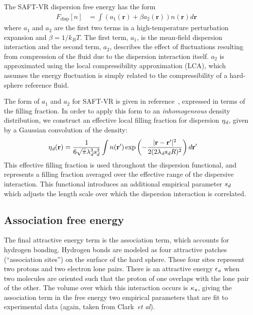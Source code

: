 \documentclass[letterpaper,twocolumn,amsmath,amssymb,prb]{revtex4-1}
\newcommand{\xx}{\textbf{r}}
\begin{document}
The SAFT-VR dispersion free energy has the form~\cite{gil-villegas-1997-SAFT-VR}
\begin{align}
  F_\text{disp}[n] &= \int \left(a_1(\xx) + \beta a_2(\xx)\right)n(\xx)d\xx
\end{align}
where $a_1$ and $a_2$ are the first two terms in a high-temperature
perturbation expansion and $\beta=1/k_BT$.  The first term, $a_1$, is 
the mean-field dispersion interaction and the second term, $a_2$, describes the
effect of fluctuations resulting from compression of the fluid due
to the dispersion interaction itself. $a_2$ is approximated
using the local compressibility approximation (LCA), which
assumes the energy fluctuation is simply related to the
compressibility of a hard-sphere reference fluid\cite{barker1976liquid}.

The form of $a_1$ and $a_2$ for SAFT-VR is given in
reference~\cite{gil-villegas-1997-SAFT-VR}, expressed in terms
of the filling fraction.  In order to apply this form to an
\emph{inhomogeneous} density distribution, we construct an effective local
filling fraction for dispersion $\eta_\textit{d}$, given by a Gaussian
convolution of the density:
\begin{align}
  \etadisp(\xx) &= \frac{1}{6\sqrt{\pi} \lambdadisp^3\lscale^3}
  \int n(\xx')\exp\left({-\frac{|\xx-\xx'|^2}{2(2 \lambdadisp
      \lscale R)^2}}\right)d\xx'
\end{align}
This effective filling fraction is used throughout the dispersion
functional, and represents a filling fraction averaged over the
effective range of the dispersive interaction.  This functional
introduces an additional empirical parameter $s_d$ which adjusts
the length scale over which the dispersion interaction is correlated.

\subsection{Association free energy}
The final attractive energy term is the association term, which
accounts for hydrogen bonding.  Hydrogen bonds are modeled as four
attractive patches (``association sites'') on the surface of the hard
sphere.  These four sites represent two protons and two electron lone
pairs.  There is an attractive energy $\epsilon_\textit{a}$ when
two molecules are oriented such that the proton of one overlaps
with the lone pair of the other.  The volume over which this
interaction occurs is $\kappa_\textit{a}$, giving the association
term in the free energy two empirical parameters that are fit to
experimental data (again, taken from Clark~\emph{et
  al}\cite{clark2006developing}).
\end{document}

